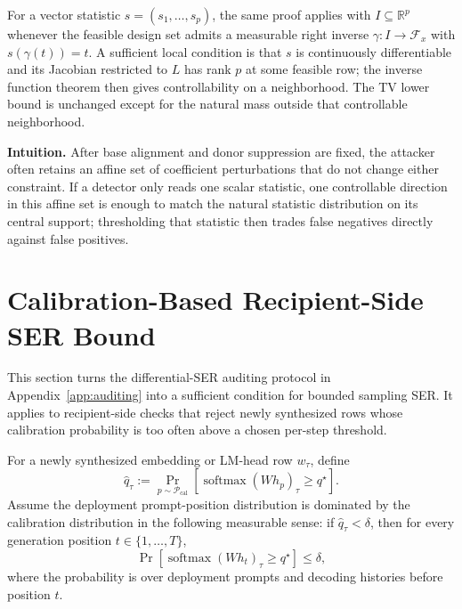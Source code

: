 \begin{remark}
\label{rem:multi-statistic-detectors}
For a vector statistic $s=(s_1,\ldots,s_p)$, the same proof applies with $I\subseteq\mathbb{R}^p$ whenever the feasible design set admits a measurable right inverse $\gamma:I\to\mathcal{F}_x$ with $s(\gamma(t))=t$. A sufficient local condition is that $s$ is continuously differentiable and its Jacobian restricted to $L$ has rank $p$ at some feasible row; the inverse function theorem then gives controllability on a neighborhood. The TV lower bound is unchanged except for the natural mass outside that controllable neighborhood.
\end{remark}

\noindent\textbf{Intuition.}
After base alignment and donor suppression are fixed, the attacker often retains an affine set of coefficient perturbations that do not change either constraint. If a detector only reads one scalar statistic, one controllable direction in this affine set is enough to match the natural statistic distribution on its central support; thresholding that statistic then trades false negatives directly against false positives.

\section{Calibration-Based Recipient-Side SER Bound}
\label{app:recipient-side-defense-ser}

This section turns the differential-SER auditing protocol in Appendix~\ref{app:auditing} into a sufficient condition for bounded sampling SER. It applies to recipient-side checks that reject newly synthesized rows whose calibration probability is too often above a chosen per-step threshold.

\begin{assumption}
\label{ass:calibration-transfer}
For a newly synthesized embedding or LM-head row $w_\tau$, define
\[
\widehat{q}_\tau
:=
\Pr_{p\sim\mathcal{P}_{\mathrm{cal}}}
\left[
\operatorname{softmax}(Wh_p)_\tau\ge q^\star
\right].
\]
Assume the deployment prompt-position distribution is dominated by the calibration distribution in the following measurable sense: if $\widehat{q}_\tau<\delta$, then for every generation position $t\in\{1,\ldots,T\}$,
\[
\Pr\left[
\operatorname{softmax}(Wh_t)_\tau\ge q^\star
\right]
\le
\delta,
\]
where the probability is over deployment prompts and decoding histories before position $t$.
\end{assumption}

